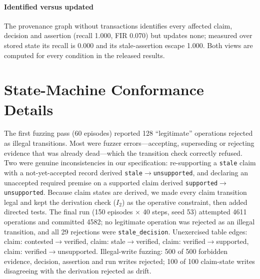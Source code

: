 \documentclass[journal]{IEEEtran}
\begin{document}
\paragraph{Identified versus updated} The provenance graph without transactions identifies every affected claim, decision and assertion (recall 1.000, FIR 0.070) but updates none; measured over stored state its recall is 0.000 and its stale-assertion escape 1.000. Both views are computed for every condition in the released results.

\section{State-Machine Conformance Details}
The first fuzzing pass (60 episodes) reported 128 ``legitimate'' operations rejected as illegal transitions. Most were fuzzer errors---accepting, superseding or rejecting evidence that was already dead---which the transition check correctly refused. Two were genuine inconsistencies in our specification: re-supporting a \texttt{stale} claim with a not-yet-accepted record derived \texttt{stale}$\to$\texttt{unsupported}, and declaring an unaccepted required premise on a supported claim derived \texttt{supported}$\to$\texttt{unsupported}. Because claim states are derived, we made every claim transition legal and kept the derivation check ($I_2$) as the operative constraint, then added directed tests. The final run (150 episodes $\times$ 40 steps, seed 53) attempted 4611 operations and committed 4582; no legitimate operation was rejected as an illegal transition, and all 29 rejections were \texttt{stale\_decision}. Unexercised table edges: claim: contested$\to$verified, claim: stale$\to$verified, claim: verified$\to$supported, claim: verified$\to$unsupported. Illegal-write fuzzing: 500 of 500 forbidden evidence, decision, assertion and run writes rejected; 100 of 100 claim-state writes disagreeing with the derivation rejected as drift.
\end{document}
